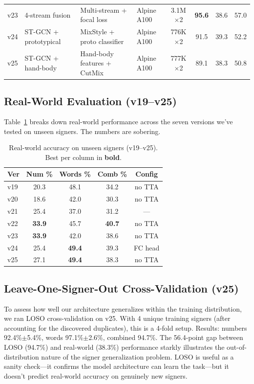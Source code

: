 \documentclass[conference]{IEEEtran}
\begin{document}
\begin{table}[t]
\begin{tabular}{@{}clllcccc@{}}
v23 & 4-stream fusion        & Multi-stream + focal loss  & Alpine A100 & 3.1M$\times$2 & \textbf{95.6} & 38.6 & 57.0 \\
v24 & ST-GCN + prototypical  & MixStyle + proto classifier & Alpine A100 & 776K$\times$2 & 91.5 & 39.3 & 52.2 \\
v25 & ST-GCN + hand-body     & Hand-body features + CutMix & Alpine A100 & 777K$\times$2 & 89.1 & 38.3 & 50.8 \\
\bottomrule
\end{tabular}
\end{table}

\subsection{Real-World Evaluation (v19--v25)}

Table~\ref{tab:real_results} breaks down real-world performance across the seven versions we've tested on unseen signers. The numbers are sobering.

\begin{table}[t]
\centering
\caption{Real-world accuracy on unseen signers (v19--v25). Best per column in \textbf{bold}.}
\label{tab:real_results}
\small
\begin{tabular}{@{}lcccc@{}}
\toprule
\textbf{Ver} & \textbf{Num \%} & \textbf{Words \%} & \textbf{Comb \%} & \textbf{Config} \\
\midrule
v19 & 20.3 & 48.1 & 34.2 & no TTA \\
v20 & 18.6 & 42.0 & 30.3 & no TTA \\
v21 & 25.4 & 37.0 & 31.2 & --- \\
v22 & \textbf{33.9} & 45.7 & \textbf{40.7} & no TTA \\
v23 & \textbf{33.9} & 42.0 & 38.6 & no TTA \\
v24 & 25.4 & \textbf{49.4} & 39.3 & FC head \\
v25 & 27.1 & \textbf{49.4} & 38.3 & no TTA \\
\bottomrule
\end{tabular}
\end{table}

\subsection{Leave-One-Signer-Out Cross-Validation (v25)}

To assess how well our architecture generalizes within the training distribution, we ran LOSO cross-validation on v25. With 4 unique training signers (after accounting for the discovered duplicates), this is a 4-fold setup. Results: numbers 92.4\%$\pm$5.4\%, words 97.1\%$\pm$2.6\%, combined 94.7\%. The 56.4-point gap between LOSO (94.7\%) and real-world (38.3\%) performance starkly illustrates the out-of-distribution nature of the signer generalization problem. LOSO is useful as a sanity check---it confirms the model architecture can learn the task---but it doesn't predict real-world accuracy on genuinely new signers.
\end{document}
